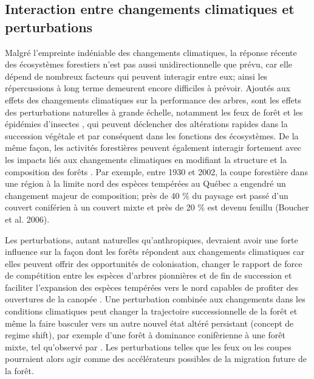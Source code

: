 \hypertarget{interaction-entre-changements-climatiques-et-perturbations}{%
\subsection{Interaction entre changements climatiques et
perturbations}\label{interaction-entre-changements-climatiques-et-perturbations}}

Malgré l'empreinte indéniable des changements climatiques, la réponse
récente des écosystèmes forestiers n'est pas aussi unidirectionnelle que
prévu, car elle dépend de nombreux facteurs qui peuvent interagir entre
eux; ainsi les répercussions à long terme demeurent encore difficiles à
prévoir. Ajoutés aux effets des changements climatiques sur la
performance des arbres, sont les effets des perturbations naturelles à
grande échelle, notamment les feux de forêt et les épidémies d'insectes
\citep{keane_exploring_2013, gauthier_vulnerability_2015, bergeron_projections_2017, boulanger_climate_2017},
qui peuvent déclencher des altérations rapides dans la succession
végétale et par conséquent dans les fonctions des écosystèmes. De la
même façon, les activités forestières peuvent également interagir
fortement avec les impacts liés aux changements climatiques en modifiant
la structure et la composition des forêts
\citep{scheller_spatially_2005, bergeron_projections_2017, boulanger_climate_2017}.
Par exemple, entre 1930 et 2002, la coupe forestière dans une région à
la limite nord des espèces tempérées au Québec a engendré un changement
majeur de composition; près de 40 \% du paysage est passé d'un couvert
coniférien à un couvert mixte et près de 20 \% est devenu feuillu
(Boucher et al. 2006).

Les perturbations, autant naturelles qu'anthropiques, devraient avoir
une forte influence sur la façon dont les forêts répondent aux
changements climatiques car elles peuvent offrir des opportunités de
colonisation, changer le rapport de force de compétition entre les
espèces d'arbres pionnières et de fin de succession et faciliter
l'expansion des espèces tempérées vers le nord capables de profiter des
ouvertures de la canopée
\citep{xu_importance_2012, woodall_assessing_2013, vanderwel_how_2014}.
Une perturbation combinée aux changements dans les conditions
climatiques peut changer la trajectoire successionnelle de la forêt et
même la faire basculer vers un autre nouvel état altéré persistant
(concept de regime shift), par exemple d'une forêt à dominance
conifèrienne à une forêt mixte, tel qu'observé par
\citet{boucher_logging-induced_2006}. Les perturbations telles que les
feux ou les coupes pourraient alors agir comme des accélérateurs
possibles de la migration future de la forêt.


